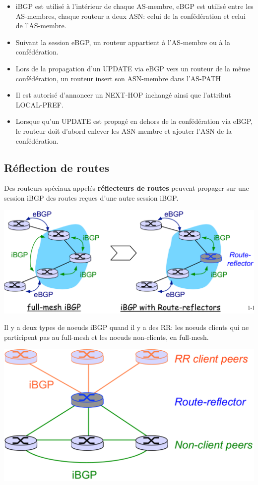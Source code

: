 \documentclass{article}
\begin{document}
\begin{sffamily}
\begin{itemize}
\item iBGP est utilisé à l'intérieur de chaque AS-membre, eBGP est
  utilisé entre les AS-membres, chaque routeur a deux ASN: celui de la
  confédération et celui de l'AS-membre.
\item Suivant la session eBGP, un routeur appartient à l'AS-membre ou
  à la confédération.
\item Lors de la propagation d'un UPDATE via eBGP vers un routeur de
  la même confédération, un routeur insert son ASN-membre dans
  l'AS-PATH
\item Il est autorisé d'annoncer un NEXT-HOP inchangé ainsi que
  l'attribut LOCAL-PREF.
\item Lorsque qu'un UPDATE est propagé en dehors de la confédération
  via eBGP, le routeur doit d'abord enlever les ASN-membre et ajouter
  l'ASN de la confédération.
\end{itemize}

\subsection{Réflection de routes}

Des routeurs spéciaux appelés \textbf{réflecteurs de routes} peuvent
propager sur une session iBGP des routes reçues d'une autre session
iBGP.

\includegraphics[width=\textwidth]{fab_007.pdf}

Il y a deux types de noeuds iBGP quand il y a des RR: les noeuds
clients qui ne participent pas au full-mesh et les noeuds non-clients,
en full-mesh.

\includegraphics[width=\textwidth]{fab_008.pdf}


\end{sffamily}
\end{document}
